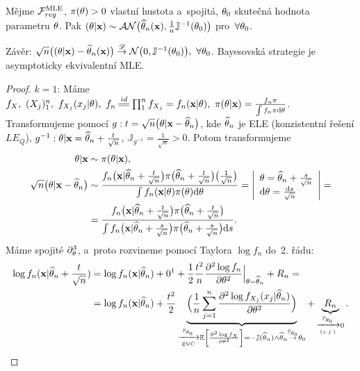 \begin{dusl}
	Mějme $\mathcal{F}_{reg}^{\mathrm{{\footnotesize MLE }}}$, $\pi(\theta)>0$ vlastní hustota a~spojitá, $\theta_0$ skutečná hodnota parametru $\theta$. Pak $(\theta|\textbf{x})\sim\mathcal{AN}\big(\widehat{\theta}_n(\textbf{x}),\frac{1}{n}\mathbb{J}^{-1}(\theta_0)\big)$ pro~$\forall\theta_0$.
	
	Závěr: $\sqrt{n}\big( (\theta|\textbf{x})-\widehat{\theta}_n(\textbf{x}) \big)\stackrel{\mathscr{D}}{\to} \mathcal{N}\big( 0,\mathbb{J}^{-1}(\theta_0) \big),~\forall\theta_0$. Bayesovská strategie je asymptoticky ekvivalentní MLE.
	\begin{proof}
		$k=1$: Máme $f_{X},~(X_j)_1^n,~f_{X_j}(x_j|\t),~f_n\equal{id}\prod_1^n f_{X_j}=f_n(\textbf{x}|\t),~\pi(\t|\textbf{x})=\frac{f_n \pi}{\int f_n \pi\d\t}$. Transformujeme pomocí $g: t=\sqrt{n}\big( \theta|\textbf{x}-\widehat{\theta}_n \big)$, kde $\widehat{\theta}_n$ je ELE (konzistentní řešení $LE_Q$), $g^{-1}:\theta|\textbf{x}=\widehat{\theta}_n + \frac{t}{\sqrt{n}}$, $\mathbb{J}_{g^{-1}}=\frac{1}{\sqrt{n}}>0$. Potom transformujeme
		\[
		\begin{split}
		\theta|\textbf{x}&\sim\pi(\theta|\textbf{x}),\\
		\sqrt{n}\big(\theta|\textbf{x}-\widehat{\theta}_n\big)&\sim\frac{f_n\big(\textbf{x}|\widehat{\theta}_n+\frac{t}{\sqrt{n}}\big)\pi\big( \widehat{\theta}_n+\frac{t}{\sqrt{n}} \big)\big(\frac{1}{\sqrt{n}}\big)}{\int f_n(\textbf{x}|\theta)\pi(\theta)\mathrm{d}\theta}=\left|\begin{array}{l}
		\theta=\widehat{\theta}_n+\frac{s}{\sqrt{n}}\\\mathrm{d}\theta=\frac{\mathrm{d} s}{\sqrt{n}}\end{array}
		\right|=\\ &=\frac{f_n\big(\textbf{x}|\widehat{\theta}_n+\frac{t}{\sqrt{n}}\big)\pi\big( \widehat{\theta}_n+\frac{t}{\sqrt{n}} \big)}{\int f_n\big(\textbf{x}|\widehat{\theta}_n+\frac{s}{\sqrt{n}}\big)\pi\big( \widehat{\theta}_n+\frac{s}{\sqrt{n}} \big)\mathrm{d} s}.
		\end{split}
		\]
		Máme spojité $\partial_\theta^3$, a~proto rozvineme pomocí Taylora $\log f_n$ do~2. řádu:
		\[
		\begin{split}
		\log f_n(\textbf{x}|\htn+\frac{t}{\sqrt{n}})&=\log f_n(\textbf{x}|\htn)+0\text{\footnotemark}+\frac{1}{2}\frac{t^2}{n}\frac{\partial^2 \log f_n}{\partial\t^2}\Big|_{\t=\htn}+R_n=\\&=\log f_n(\textbf{x}|\htn)+\frac{t^2}{2}\underbrace{\Big( \frac{1}{n}\sumjn \frac{\partial^2 \log f_{X_j}(x_j|\htn)}{\partial\t^2} \Big)}_{\xrightarrow[\text{ZVČ}]{\PP_{\t_0}}\EE{\frac{\partial^2\log f_X}{\partial\t^2}}=-\mathbb{J}(\htn)\wedge \htn \stackrel{\PP_{\t_0}}{\rightarrow} \t_0}+\underbrace{R_n}_{\xrightarrow[(s.j.)]{\PP_{\t_0}}0}.
		\end{split}
		\]

\end{proof}
\end{dusl}
